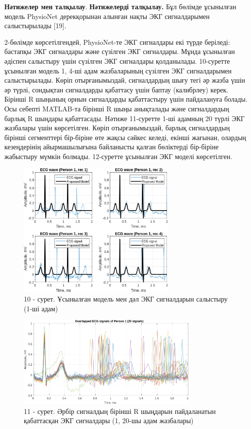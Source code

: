 \begin{multicols}{2}
{\bfseries Нәтижелер мен талқылау}. {\bfseries Нәтижелерді талқылау.} Бұл
бөлімде ұсынылған модель PhysioNet дерекқорынан алынған нақты ЭКГ
сигналдарымен салыстырылады {[}19{]}.

2-бөлімде көрсетілгендей, PhysioNet-те ЭКГ сигналдары екі түрде
беріледі: бастапқы ЭКГ сигналдары және сүзілген ЭКГ сигналдары. Мұнда
ұсынылған әдіспен салыстыру үшін сүзілген ЭКГ сигналдары қолданылады.
10-суретте ұсынылған модель 1, 4-ші адам жазбаларының сүзілген ЭКГ
сигналдарымен салыстырылады. Көріп отырғанымыздай, сигналдардың шығу
тегі әр жазба үшін әр түрлі, сондықтан сигналдарды қабаттасу үшін баптау
(калибрлеу) керек. Бірінші R шыңының орнын сигналдарды қабаттастыру үшін
пайдалануға болады. Осы себепті MATLAB-та бірінші R шыңы анықталады және
сигналдардың барлық R шыңдары қабаттасады. Нәтиже 11-суретте 1-ші
адамның 20 түрлі ЭКГ жазбалары үшін көрсетілген. Көріп отырғанымыздай,
барлық сигналдардың бірінші сегменттері бір-біріне өте жақсы сәйкес
келеді, екінші жағынан, олардың кезеңдерінің айырмашылығына байланысты
қалған бөліктерді бір-біріне жабыстыру мүмкін болмады. 12-суретте
ұсынылған ЭКГ моделі көрсетілген.
\end{multicols}

\begin{figure}[H]
	\centering
	\includegraphics[width=0.7\textwidth]{media/ict/image50}
	\caption*{10 - сурет. Ұсынылған модель мен дәл ЭКГ сигналдарын салыстыру (1-ші адам)}
\end{figure}

\begin{figure}[H]
	\centering
	\includegraphics[width=0.8\textwidth]{media/ict/image51}
	\caption*{11 - сурет. Әрбір сигналдың бірінші R шыңдарын пайдаланатын қабаттасқан ЭКГ сигналдары (1, 20-шы адам жазбалары)}
\end{figure}


